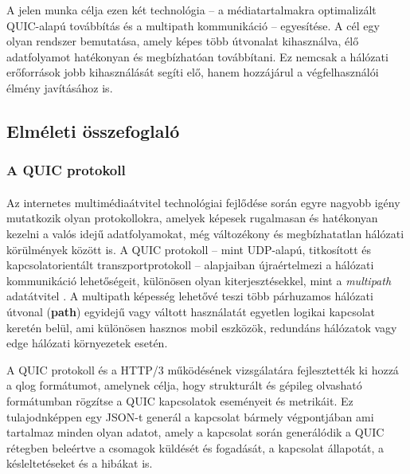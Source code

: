 \documentclass[a4paper,oneside]{article}
\begin{document}
A jelen munka célja ezen két technológia – a médiatartalmakra optimalizált QUIC-alapú 
továbbítás és a multipath kommunikáció – egyesítése. A cél egy olyan rendszer bemutatása, 
amely képes több útvonalat kihasználva, élő adatfolyamot hatékonyan és megbízhatóan 
továbbítani. Ez nemcsak a hálózati erőforrások jobb kihasználását segíti elő, hanem 
hozzájárul a végfelhasználói élmény javításához is.



\subsection{Elméleti összefoglaló}

\subsubsection{A QUIC protokoll}
\paragraph{}
Az internetes multimédiaátvitel technológiai fejlődése során egyre 
nagyobb igény mutatkozik olyan protokollokra, amelyek képesek 
rugalmasan és hatékonyan kezelni a valós idejű adatfolyamokat, még 
változékony és megbízhatatlan hálózati körülmények között is. \cite{quic} A QUIC 
protokoll – mint UDP-alapú, titkosított és kapcsolatorientált 
transzportprotokoll – alapjaiban újraértelmezi a hálózati kommunikáció 
lehetőségeit, különösen olyan kiterjesztésekkel, mint a \emph{multipath} 
adatátvitel \cite{mp_quic}. A multipath képesség lehetővé teszi több párhuzamos hálózati 
útvonal (\textbf{path}) egyidejű vagy váltott használatát egyetlen logikai kapcsolat keretén 
belül, ami különösen hasznos mobil eszközök, redundáns hálózatok vagy edge 
hálózati környezetek esetén.

A QUIC protokoll és a HTTP/3 működésének vizsgálatára fejlesztették ki hozzá a qlog \cite{qlog} formátumot, amelynek célja,
hogy strukturált és gépileg olvasható formátumban rögzítse a QUIC kapcsolatok eseményeit és metrikáit.
Ez tulajodnképpen egy JSON-t generál a kapcsolat bármely végpontjában ami tartalmaz minden olyan adatot, amely a 
kapcsolat során generálódik a QUIC rétegben beleértve a csomagok küldését és fogadását,
a kapcsolat állapotát, a késleltetéseket és a hibákat is.
\end{document}
